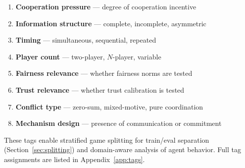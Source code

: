 \begin{enumerate}[nosep]
    \item \textbf{Cooperation pressure} --- degree of cooperation incentive
    \item \textbf{Information structure} --- complete, incomplete, asymmetric
    \item \textbf{Timing} --- simultaneous, sequential, repeated
    \item \textbf{Player count} --- two-player, $N$-player, variable
    \item \textbf{Fairness relevance} --- whether fairness norms are tested
    \item \textbf{Trust relevance} --- whether trust calibration is tested
    \item \textbf{Conflict type} --- zero-sum, mixed-motive, pure coordination
    \item \textbf{Mechanism design} --- presence of communication or commitment
\end{enumerate}

These tags enable stratified game splitting for train/eval separation
(Section~\ref{sec:splitting}) and domain-aware analysis of agent behavior.
Full tag assignments are listed in Appendix~\ref{app:tags}.
